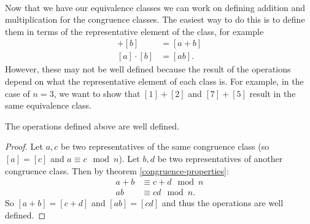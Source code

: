 \documentclass[../abstract_algebra.tex]{subfiles}
\begin{document}
        \paragraph{}
        Now that we have our equivalence classes we can work on defining addition and multiplication for the congruence classes.
        The easiest way to do this is to define them in terms of the representative element of the class, for example
        \begin{align}
            [a]+[b]&=[a+b]\\
            [a]\cdot[b]&=[ab].
        \end{align}
        However, these may not be well defined because the result of the operations depend on what the representative element of each class is.
        For example, in the case of $n=3$, we want to show that $[1]+[2]$ and $[7]+[5]$ result in the same equivalence class.
        \begin{lemma}
            The operations defined above are well defined.
        \end{lemma}
        \begin{proof}
            Let $a,c$ be two representatives of the same congruence class (so $[a]=[c]$ and $a\equiv c\mod n$).
            Let $b,d$ be two representatives of another congruence class.
            Then by theorem \ref{congruence-properties}:
            \begin{align}
                a+b&\equiv c+d\mod n\\
                ab&\equiv cd\mod n.
            \end{align}
            So $[a+b]=[c+d]$ and $[ab]=[cd]$ and thus the operations are well defined.
        \end{proof}
\end{document}
